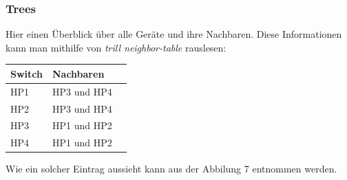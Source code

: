 \documentclass[a4,12pt]{scrartcl}
\begin{document}
\subsubsection{Trees}
Hier einen Überblick über alle Geräte und ihre Nachbaren. Diese Informationen kann man mithilfe von \textit{trill neighbor-table} rauslesen: 
\begin{center}
    \begin{tabular}{@{} l l r@{}}\toprule    
    {Switch} & {Nachbaren}\\ \midrule
    HP1 & HP3 und HP4\\ \addlinespace
    HP2 & HP3 und HP4\\ \addlinespace
    HP3 & HP1 und HP2\\ \addlinespace
    HP4 & HP1 und HP2\\ 
    \bottomrule
    \end{tabular}
\end{center}
Wie ein solcher Eintrag aussieht kann aus der Abbilung 7 entnommen werden. 
\end{document}
